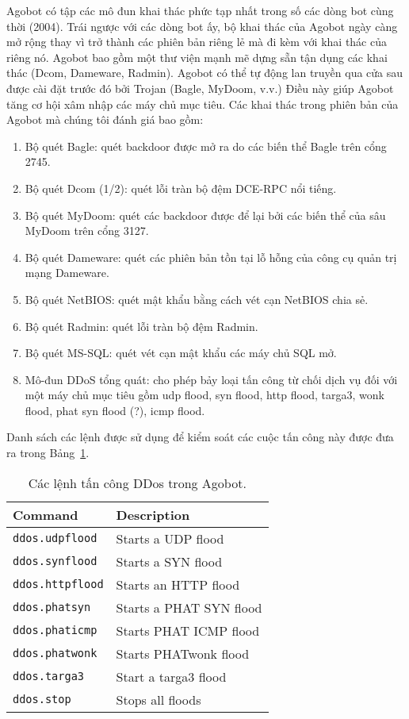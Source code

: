 Agobot có tập các mô đun khai thác phức tạp nhất trong số các dòng bot cùng thời (2004).
Trái ngược với các dòng bot ấy, bộ khai thác của Agobot ngày càng mở rộng thay vì trở thành các phiên bản riêng lẻ mà đi kèm với khai thác của riêng nó.
Agobot bao gồm một thư viện mạnh mẽ dựng sẵn tận dụng các khai thác (Dcom, Dameware, Radmin).
Agobot có thể tự động lan truyền qua cửa sau được cài đặt trước đó bởi Trojan (Bagle, MyDoom, v.v.)
Điều này giúp Agobot tăng cơ hội xâm nhập các máy chủ mục tiêu.
Các khai thác trong phiên bản của Agobot mà chúng tôi đánh giá bao gồm:

\begin{enumerate}
\item Bộ quét Bagle\@: quét backdoor được mở ra do các biến thể Bagle trên cổng 2745.
\item Bộ quét Dcom (1/2): quét lỗi tràn bộ đệm DCE-RPC nổi tiếng.
\item Bộ quét MyDoom\@: quét các backdoor được để lại bởi các biến thể của sâu MyDoom trên cổng 3127.
\item Bộ quét Dameware\@: quét các phiên bản tồn tại lỗ hỗng của công cụ quản trị mạng Dameware.
\item Bộ quét NetBIOS\@: quét mật khẩu bằng cách vét cạn NetBIOS chia sẻ.
\item Bộ quét Radmin: quét lỗi tràn bộ đệm Radmin.
\item Bộ quét MS-SQL\@: quét vét cạn mật khẩu các máy chủ SQL mở.
\item Mô-đun DDoS tổng quát: cho phép bảy loại tấn công từ chối dịch vụ đối với một máy chủ mục
	tiêu gồm udp flood, syn flood, http flood, targa3, wonk flood, phat syn flood (?), icmp flood.
\end{enumerate}

Danh sách các lệnh được sử dụng để kiểm soát các cuộc tấn công này được đưa ra trong Bảng~\ref{table:botattack}.

\begin{table}[ht!]
	\caption{Các lệnh tấn công DDos trong Agobot.}\label{table:botattack}
	\centering
	\footnotesize
	\begin{tabular}{l l}
		\toprule
		\textbf{Command} &
		\textbf{Description} \\
		\midrule
\texttt{ddos.udpflood} & Starts a UDP flood\\
\texttt{ddos.synflood} & Starts a SYN flood\\
\texttt{ddos.httpflood} & Starts an HTTP flood\\
\texttt{ddos.phatsyn} & Starts a PHAT SYN flood\\
\texttt{ddos.phaticmp} & Starts PHAT ICMP flood\\
\texttt{ddos.phatwonk} & Starts PHATwonk flood\\
\texttt{ddos.targa3} & Start a targa3 flood\\
\texttt{ddos.stop} & Stops all floods\\
		\bottomrule
	\end{tabular}
\end{table}

